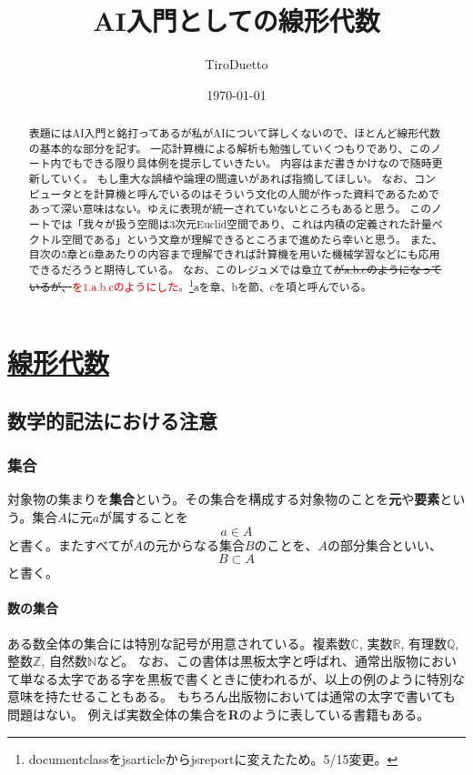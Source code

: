 \documentclass[10pt]{jsreport}
\title{AI入門としての線形代数}
\author{TiroDuetto}
\date{\today}
\theoremstyle{definition}%
\numberwithin{equation}{section}%
\begin{document}
\maketitle

\begin{abstract}
表題にはAI入門と銘打ってあるが私がAIについて詳しくないので、ほとんど線形代数の基本的な部分を記す。
一応計算機による解析も勉強していくつもりであり、このノート内でもできる限り具体例を提示していきたい。
内容はまだ書きかけなので随時更新していく。
もし重大な誤植や論理の間違いがあれば指摘してほしい。
なお、コンピュータとを計算機と呼んでいるのはそういう文化の人間が作った資料であるためであって深い意味はない。ゆえに表現が統一されていないところもあると思う。
このノートでは「我々が扱う空間は3次元Euclid空間であり、これは内積の定義された計量ベクトル空間である」という文章が理解できるところまで進めたら幸いと思う。
また、目次の5章と6章あたりの内容まで理解できれば計算機を用いた機械学習などにも応用できるだろうと期待している。
なお、このレジュメでは章立て\sout{がa.b.cのようになっているが、}\textcolor{red}{を1.a.b.cのようにした。}\footnote{documentclassをjsarticleからjsreportに変えたため。5/15変更。}aを章、bを節、cを項と呼んでいる。
\end{abstract}
\tableofcontents
\chapter{\underline{線形代数}}
\setcounter{section}{-1}
\section{数学的記法における注意}
\subsection{集合}
対象物の集まりを{\bf 集合}という。その集合を構成する対象物のことを{\bf 元}や{\bf 要素}という。集合$A$に元$a$が属することを
\begin{equation}
  a \in A 
\end{equation}
と書く。またすべてが$A$の元からなる集合$B$のことを、$A$の部分集合といい、
\begin{equation}
  B \subset A
\end{equation}
と書く。
\subsubsection{数の集合}
ある数全体の集合には特別な記号が用意されている。複素数$\mathbb{C}$, 実数$\mathbb{R}$, 有理数$\mathbb{Q}$, 整数$\mathbb{Z}$, 自然数$\mathbb{N}$など。
なお、この書体は黒板太字と呼ばれ、通常出版物において単なる太字である字を黒板で書くときに使われるが、以上の例のように特別な意味を持たせることもある。
もちろん出版物においては通常の太字で書いても問題はない。
例えば実数全体の集合を{\bf R}のように表している書籍もある。
\end{document}
